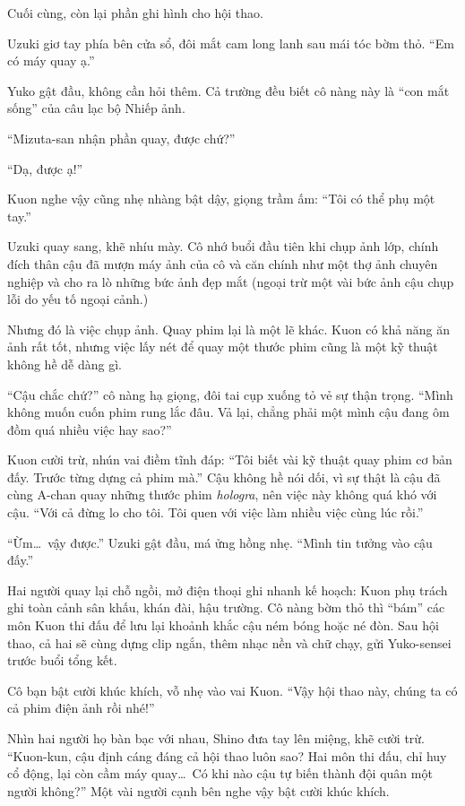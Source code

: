 \documentclass[../main.tex]{subfiles}
\begin{document}
Cuối cùng, còn lại phần ghi hình cho hội thao.

Uzuki giơ tay phía bên cửa sổ, đôi mắt cam long lanh sau mái tóc bờm thỏ. ``Em có máy quay ạ.''

Yuko gật đầu, không cần hỏi thêm. Cả trường đều biết cô nàng này là ``con mắt sống'' của câu lạc bộ Nhiếp ảnh.

``Mizuta-san nhận phần quay, được chứ?''

``Dạ, được ạ!''

Kuon nghe vậy cũng nhẹ nhàng bật dậy, giọng trầm ấm: ``Tôi có thể phụ một tay.''

Uzuki quay sang, khẽ nhíu mày. Cô nhớ buổi đầu tiên khi chụp ảnh lớp, chính đích thân cậu đã mượn máy ảnh của cô và căn chính như một thợ ảnh chuyên nghiệp và cho ra lò những bức ảnh đẹp mắt (ngoại trừ một vài bức ảnh cậu chụp lỗi do yếu tố ngoại cảnh.)

Nhưng đó là việc chụp ảnh. Quay phim lại là một lẽ khác. Kuon có khả năng ăn ảnh rất tốt, nhưng việc lấy nét để quay một thước phim cũng là một kỹ thuật không hề dễ dàng gì.

``Cậu chắc chứ?'' cô nàng hạ giọng, đôi tai cụp xuống tỏ vẻ sự thận trọng. ``Mình không muốn cuốn phim rung lắc đâu. Vả lại, chẳng phải một mình cậu đang ôm đồm quá nhiều việc hay sao?''

Kuon cười trừ, nhún vai điềm tĩnh đáp: ``Tôi biết vài kỹ thuật quay phim cơ bản đấy. Trước từng dựng cả phim mà.'' Cậu không hề nói dối, vì sự thật là cậu đã cùng A-chan quay những thước phim \textit{hologra}, nên việc này không quá khó với cậu. ``Với cả đừng lo cho tôi. Tôi quen với việc làm nhiều việc cùng lúc rồi.''

``Ừm\dots\ vậy được.'' Uzuki gật đầu, má ửng hồng nhẹ. ``Mình tin tưởng vào cậu đấy.''

Hai người quay lại chỗ ngồi, mở điện thoại ghi nhanh kế hoạch: Kuon phụ trách ghi toàn cảnh sân khấu, khán đài, hậu trường. Cô nàng bờm thỏ thì ``bám'' các môn Kuon thi đấu để lưu lại khoảnh khắc cậu ném bóng hoặc né đòn. Sau hội thao, cả hai sẽ cùng dựng clip ngắn, thêm nhạc nền và chữ chạy, gửi Yuko-sensei trước buổi tổng kết.

Cô bạn bật cười khúc khích, vỗ nhẹ vào vai Kuon. ``Vậy hội thao này, chúng ta có cả phim điện ảnh rồi nhé!''

Nhìn hai người họ bàn bạc với nhau, Shino đưa tay lên miệng, khẽ cười trừ. ``Kuon-kun, cậu định cáng đáng cả hội thao luôn sao? Hai môn thi đấu, chỉ huy cổ động, lại còn cầm máy quay\dots\ Có khi nào cậu tự biến thành đội quân một người không?'' Một vài người cạnh bên nghe vậy bật cười khúc khích.
\end{document}
